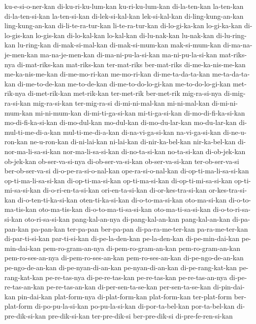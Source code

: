 {ku-e-si-o-ner-kan di-ku-ri-ku-lum-kan ku-ri-ku-lum-kan di-la-ten-kan la-ten-kan di-la-ten-si-kan la-ten-si-kan di-lek-si-kal-kan
lek-si-kal-kan di-ling-kung-an-kan ling-kung-an-kan di-li-te-ra-tur-kan li-te-ra-tur-kan di-lo-gi-ka-kan lo-gi-ka-kan di-lo-gis-kan
lo-gis-kan di-lo-kal-kan lo-kal-kan di-lu-nak-kan lu-nak-kan di-lu-ring-kan lu-ring-kan di-mak-si-mal-kan
di-mak-si-mum-kan mak-si-mum-kan di-ma-na-je-men-kan ma-na-je-men-kan di-ma-ni-pu-la-si-kan ma-ni-pu-la-si-kan mat-riks-nya di-mat-riks-kan
mat-riks-kan ter-mat-riks ber-mat-riks di-me-ka-nis-me-kan me-ka-nis-me-kan di-me-mo-ri-kan me-mo-ri-kan di-me-ta-da-ta-kan
me-ta-da-ta-kan di-me-to-de-kan me-to-de-kan di-me-to-do-lo-gi-kan me-to-do-lo-gi-kan met-rik-nya di-met-rik-kan met-rik-kan
ter-met-rik ber-met-rik mig-ra-si-nya di-mig-ra-si-kan mig-ra-si-kan ter-mig-ra-si di-mi-ni-mal-kan mi-ni-mal-kan
di-mi-ni-mum-kan mi-ni-mum-kan di-mi-ti-ga-si-kan mi-ti-ga-si-kan di-mo-di-fi-ka-si-kan mo-di-fi-ka-si-kan di-mo-dul-kan mo-dul-kan
di-mo-du-lar-kan mo-du-lar-kan di-mul-ti-me-di-a-kan mul-ti-me-di-a-kan di-na-vi-ga-si-kan na-vi-ga-si-kan di-ne-u-ron-kan ne-u-ron-kan
di-ni-lai-kan ni-lai-kan di-nir-ka-bel-kan nir-ka-bel-kan di-nor-ma-li-sa-si-kan nor-ma-li-sa-si-kan di-no-ta-si-kan no-ta-si-kan
di-ob-jek-kan ob-jek-kan ob-ser-va-si-nya di-ob-ser-va-si-kan ob-ser-va-si-kan ter-ob-ser-va-si ber-ob-ser-va-si di-o-pe-ra-si-o-nal-kan
ope-ra-si-o-nal-kan di-op-ti-ma-li-sa-si-kan op-ti-ma-li-sa-si-kan di-op-ti-ma-si-kan op-ti-ma-si-kan di-op-ti-mi-sa-si-kan op-ti-mi-sa-si-kan di-o-ri-en-ta-si-kan
ori-en-ta-si-kan di-or-kes-tra-si-kan or-kes-tra-si-kan di-o-ten-ti-ka-si-kan oten-ti-ka-si-kan di-o-to-ma-si-kan oto-ma-si-kan di-o-to-ma-tis-kan
oto-ma-tis-kan di-o-to-ma-ti-sa-si-kan oto-ma-ti-sa-si-kan di-o-to-ri-sa-si-kan oto-ri-sa-si-kan pang-kal-an-nya di-pang-kal-an-kan pang-kal-an-kan
di-pa-pan-kan pa-pan-kan ter-pa-pan ber-pa-pan di-pa-ra-me-ter-kan pa-ra-me-ter-kan di-par-ti-si-kan par-ti-si-kan
di-pe-la-den-kan pe-la-den-kan di-pe-min-dai-kan pe-min-dai-kan pem-ro-gram-an-nya di-pem-ro-gram-an-kan pem-ro-gram-an-kan pem-ro-ses-an-nya
di-pem-ro-ses-an-kan pem-ro-ses-an-kan di-pe-ngo-de-an-kan pe-ngo-de-an-kan di-pe-nyan-di-an-kan pe-nyan-di-an-kan di-pe-rang-kat-kan pe-rang-kat-kan
pe-re-tas-nya di-pe-re-tas-kan pe-re-tas-kan pe-re-tas-an-nya di-pe-re-tas-an-kan pe-re-tas-an-kan di-per-sen-ta-se-kan per-sen-ta-se-kan
di-pin-dai-kan pin-dai-kan plat-form-nya di-plat-form-kan plat-form-kan ter-plat-form ber-plat-form di-po-pu-la-si-kan
po-pu-la-si-kan di-por-ta-bel-kan por-ta-bel-kan di-pre-dik-si-kan pre-dik-si-kan ter-pre-dik-si ber-pre-dik-si di-pre-fe-ren-si-kan
}
